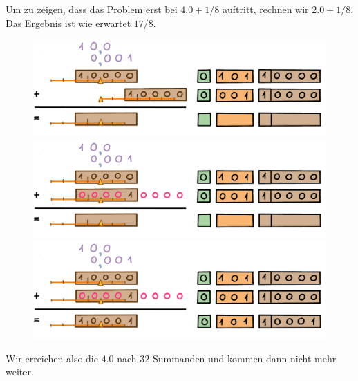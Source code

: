 Um zu zeigen, dass das Problem erst bei \(4.0 + 1/8\) auftritt, rechnen wir \(2.0 + 1/8\). Das Ergebnis ist wie erwartet \(17/8\).
\begin{figure}[H]
\centering
\includegraphics[width=\linewidth]{Pictures/Addition2and1-8_1.png} 
\includegraphics[width=\linewidth]{Pictures/Addition2and1-8_2.png} 
\includegraphics[width=\linewidth]{Pictures/Addition2and1-8_3.png} 
\end{figure}
Wir erreichen also die \(4.0\) nach 32 Summanden und kommen dann nicht mehr weiter.


